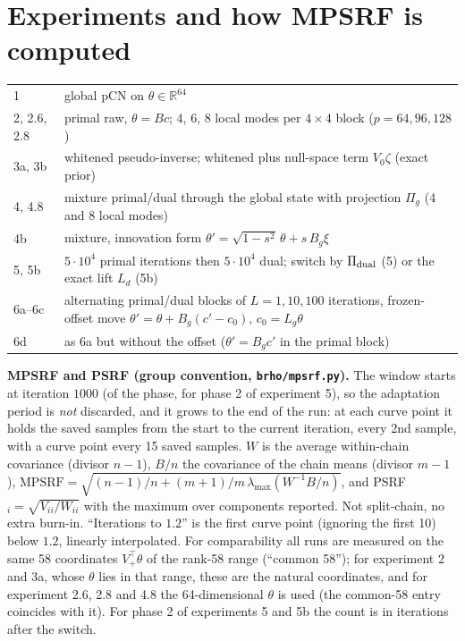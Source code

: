 \documentclass[11pt]{article}
\begin{document}
\section{Experiments and how MPSRF is computed}
\begin{center}\small
\begin{tabular}{@{}lp{}@{}}\toprule
1 & global pCN on $\theta\in\mathbb R^{64}$\\
2, 2.6, 2.8 & primal raw, $\theta=Bc$; $4$, $6$, $8$ local modes per $4\times4$ block ($p=64,96,128$)\\
3a, 3b & whitened pseudo-inverse; whitened plus null-space term $V_0\zeta$ (exact prior)\\
4, 4.8 & mixture primal/dual through the global state with projection $\Pi_g$ (4 and 8 local modes)\\
4b & mixture, innovation form $\theta'=\sqrt{1-s^2}\,\theta+s\,B_g\xi$\\
5, 5b & $5\cdot10^4$ primal iterations then $5\cdot10^4$ dual; switch by $\Pi_{\rm dual}$ (5) or the exact lift $L_d$ (5b)\\
6a--6c & alternating primal/dual blocks of $L=1,10,100$ iterations, frozen-offset move $\theta'=\theta+B_g(c'-c_0)$, $c_0=L_g\theta$\\
6d & as 6a but without the offset ($\theta'=B_gc'$ in the primal block)\\ \bottomrule
\end{tabular}
\end{center}
\textbf{MPSRF and PSRF (group convention, \texttt{brho/mpsrf.py}).} The window starts at iteration $1000$ (of the phase, for phase 2 of experiment 5), so the adaptation period is \emph{not} discarded, and it grows to the end of the run: at each curve point it holds the saved samples from the start to the current iteration, every 2nd sample, with a curve point every 15 saved samples. $W$ is the average within-chain covariance (divisor $n-1$), $B/n$ the covariance of the chain means (divisor $m-1$), $\mathrm{MPSRF}=\sqrt{(n-1)/n+(m+1)/m\,\lambda_{\max}(W^{-1}B/n)}$, and PSRF$_i=\sqrt{V_{ii}/W_{ii}}$ with the maximum over components reported. Not split-chain, no extra burn-in. ``Iterations to $1.2$'' is the first curve point (ignoring the first 10) below $1.2$, linearly interpolated. For comparability all runs are measured on the same 58 coordinates $V_+^\top\theta$ of the rank-58 range (``common 58''); for experiment 2 and 3a, whose $\theta$ lies in that range, these are the natural coordinates, and for experiment 2.6, 2.8 and 4.8 the 64-dimensional $\theta$ is used (the common-58 entry coincides with it). For phase 2 of experiments 5 and 5b the count is in iterations after the switch.
\end{document}
